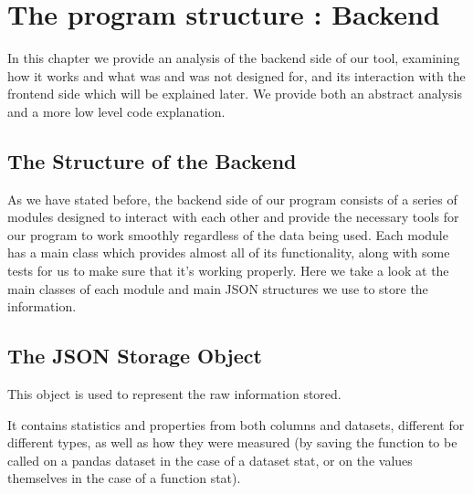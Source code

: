 %
%

\chapter{The program structure : Backend}

\begin{resumen}
In this chapter we provide an analysis of the backend side of our tool, examining how it works and what was and was not designed for, and its interaction with the frontend side which will be explained later.
We provide both an abstract analysis and a more low level code explanation.
\end{resumen}


\section{The Structure of the Backend}
\label{cap2:sec:structure}

As we have stated before, the backend side of our program consists of a series of modules designed to interact with each other and provide the necessary tools for our program to work smoothly regardless of the data being used.
Each module has a main class which provides almost all of its functionality, along with some tests for us to make sure that it's working properly.
Here we take a look at the main classes of each module and main JSON structures we use to store the information.

\section{The JSON Storage Object}
\label{cap2:sec:json}

This object is used to represent the raw information stored.

It contains statistics and properties from both columns and datasets, different for different types, as well as how they were measured (by saving the function to be called on a pandas dataset in the case of a dataset stat, or on the values themselves in the case of a function stat).


